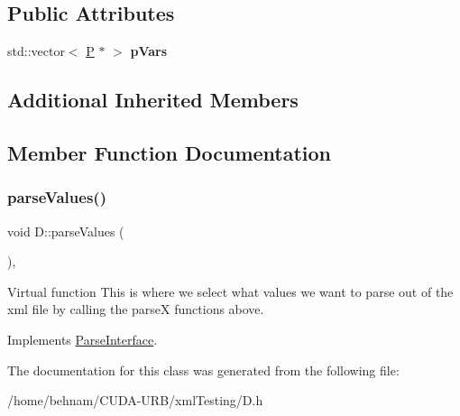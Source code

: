 \subsection*{Public Attributes}
\begin{DoxyCompactItemize}
\item 
\mbox{\label{classD_ad1756e0458999b2ba792d35d2715cb83}} 
std\+::vector$<$ \hyperlink{classP}{P} $\ast$ $>$ {\bfseries p\+Vars}
\end{DoxyCompactItemize}
\subsection*{Additional Inherited Members}


\subsection{Member Function Documentation}
\mbox{\label{classD_afd52a3aa7a7e9047386deb6aeb796b2a}} 
\subsubsection{\texorpdfstring{parse\+Values()}{parseValues()}}
{\footnotesize\ttfamily void D\+::parse\+Values (\begin{DoxyParamCaption}{ }\end{DoxyParamCaption})\hspace{0.3cm}{\ttfamily [inline]}, {\ttfamily [virtual]}}

Virtual function This is where we select what values we want to parse out of the xml file by calling the parseX functions above. 

Implements \hyperlink{classParseInterface_afca32108192ba0997c9e5a78189b0cbc}{Parse\+Interface}.



The documentation for this class was generated from the following file\+:\begin{DoxyCompactItemize}
\item 
/home/behnam/\+C\+U\+D\+A-\/\+U\+R\+B/xml\+Testing/D.\+h\end{DoxyCompactItemize}
